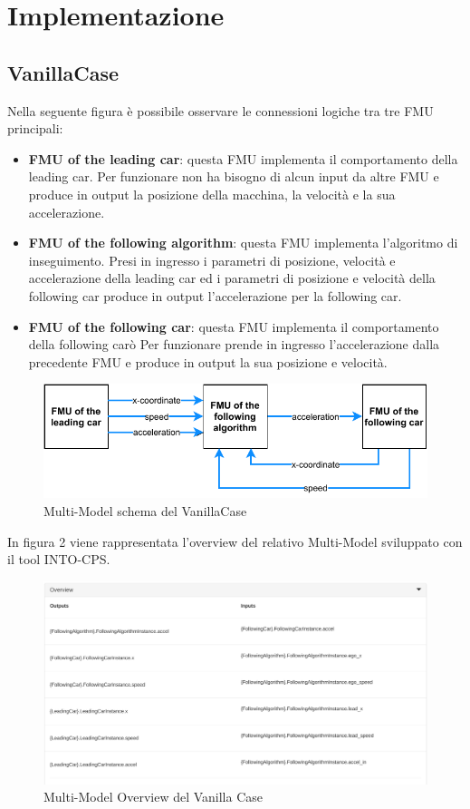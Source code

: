 \section{Implementazione}
\subsection{VanillaCase}
Nella seguente figura è possibile osservare le connessioni logiche tra tre FMU principali: 
\begin{itemize}
	\item \textbf{FMU of the leading car}: questa FMU implementa il comportamento della leading car. Per funzionare non ha bisogno di alcun input da altre FMU e produce in output la posizione della macchina, la velocità e la sua accelerazione. 
	\item \textbf{FMU of the following algorithm}: questa FMU implementa l'algoritmo di inseguimento. Presi in ingresso i parametri di posizione, velocità e accelerazione della leading car ed i parametri di posizione e velocità della following car produce in output l'accelerazione per la following car.
	\item \textbf{FMU of the following car}: questa FMU implementa il comportamento della following carò Per funzionare prende in ingresso l'accelerazione dalla precedente FMU e produce in output la sua posizione e velocità.
\end{itemize}
\begin{figure}[H]
	\centering
	\includegraphics{img/VanillaSchema.pdf}
	\caption{Multi-Model schema del VanillaCase}
\end{figure}

In figura 2 viene rappresentata l'overview del relativo Multi-Model sviluppato con il tool INTO-CPS. 

\begin{figure}[H]
	\centering
	\includegraphics[width=\textwidth]{img/OverviewVanilla.png}
	\caption{Multi-Model Overview del Vanilla Case}
\end{figure}

